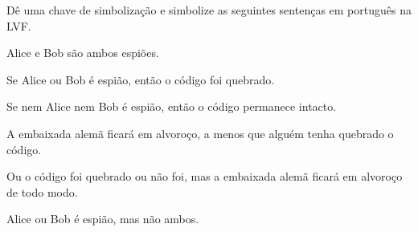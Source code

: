 \solutions
\problempart
\label{pr.spies}
Dê uma chave de simbolização e simbolize as seguintes sentenças em português na LVF.
\begin{compactlist}
\item Alice e Bob são ambos espiões.
\item[] 
\item Se Alice ou Bob é espião, então o código foi quebrado.
\item[] 
\item Se nem Alice nem Bob é espião, então o código permanece intacto.
\item[] 
\item A embaixada alemã ficará em alvoroço, a menos que alguém tenha quebrado o código.
\item[] 
\item Ou o código foi quebrado ou não foi, mas a embaixada alemã ficará em alvoroço de todo modo.
\item[] 
\item Alice ou Bob é espião, mas não ambos.
\item[] 
\end{compactlist}


